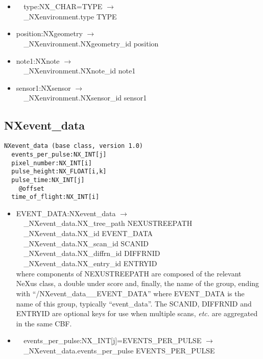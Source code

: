 \documentclass[11pt]{article}
\begin{document}
{{\begin{itemize}
\item{\verb|  |type:NX\_CHAR=TYPE $\rightarrow$\\
\verb|  |\_NXenvironment.type TYPE}

\item{position:NXgeometry $\rightarrow$\\
\verb|  |\_NXenvironment.NXgeometry\_id position}

\item{note1:NXnote $\rightarrow$\\
\verb|  |\_NXenvironment.NXnote\_id note1}

\item{sensor1:NXsensor $\rightarrow$\\
\verb|  |\_NXenvironment.NXsensor\_id sensor1}
\end{itemize}
\subsection{NXevent\_data}

\begin{verbatim}
NXevent_data (base class, version 1.0)
  events_per_pulse:NX_INT[j]
  pixel_number:NX_INT[i]
  pulse_height:NX_FLOAT[i,k]
  pulse_time:NX_INT[j]
    @offset
  time_of_flight:NX_INT[i]
\end{verbatim}

\begin{itemize}

\item{EVENT\_DATA:NXevent\_data $\rightarrow$\\
\verb|  |\_NXevent\_data.NX\_tree\_path    NEXUSTREEPATH \\
\verb|  |\_NXevent\_data.NX\_id            EVENT\_DATA\\
\verb|  |\_NXevent\_data.NX\_scan\_id      SCANID \\
\verb|  |\_NXevent\_data.NX\_diffrn\_id    DIFFRNID \\
\verb|  |\_NXevent\_data.NX\_entry\_id     ENTRYID \\
where components of NEXUSTREEPATH are composed of the
relevant NeXus class, a double under score and, finally, the
name of the group, ending with ``/NXevent\_data\_\_EVENT\_DATA''
where EVENT\_DATA is the name of this group, typically ``event\_data''.
The SCANID, DIFFRNID and ENTRYID are optional keys for use
when multiple scans, {\it etc.} are aggregated in the same CBF.}

\item{\verb|  |events\_per\_pulse:NX\_INT[j]=EVENTS\_PER\_PULSE $\rightarrow$\\
\verb|  |\_NXevent\_data.events\_per\_pulse EVENTS\_PER\_PULSE}


\end{itemize}}}
\end{document}
